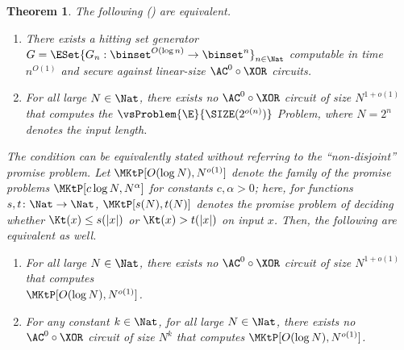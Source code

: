 \documentclass[11pt]{article}
\numberwithin{equation}{section}
\newtheorem{theorem}{Theorem}[section]
\theoremstyle{definition}
\theoremstyle{plain}
\begin{document}
\begin{theorem}
  \label{thm_AC0XOREquiv}
  The following () are equivalent.
  \begin{enumerate}
    \item
          \label{item_HSGagainstAC0XOR}
          There exists a hitting set generator $G = \ESet{ G_n : \binset^{O(\log n)} \to \binset^n }_{n \in \Nat} $ computable in time $n^{O(1)}$ and secure against linear-size $\AC^0 \circ \XOR$ circuits.
    \item
          \label{item_EvsSIZE}
          For all large $N \in \Nat$,
          there exists no $\AC^0 \circ \XOR$ circuit of size
          $N^{1 + o(1)}$
          that computes
          the $\vsProblem{\E}{\SIZE (2^{o(n)})}$ Problem, where $N = 2^n$ denotes the input length.
          \setcounter{TEMPenumi}{\value{enumi}}
  \end{enumerate}
  \begin{upshape}
    The condition can be equivalently stated without referring to the ``non-disjoint'' promise problem.
    Let $\MKtP[O(\log N), N^{o(1)}]$ denote the family of the promise problems
    $\MKtP[c \log N, N^\alpha]$ for constants $c, \alpha > 0$;
    here,
    for functions $s, t \colon \Nat \to \Nat$,
    $\MKtP[s(N), t(N)]$ denotes the promise problem of
    deciding whether $\Kt(x) \le s(|x|)$
    or $\Kt(x) > t(|x|)$ on input $x$.
    Then, the following are equivalent as well.
  \end{upshape}
  \begin{enumerate}
    \setcounter{enumi}{\value{TEMPenumi}}
    \item
          \label{item_EvsKt}
          For all large $N \in \Nat$,
          there exists no $\AC^0 \circ \XOR$ circuit of size
          $N^{1 + o(1)}$
          that computes\\  %
          $\MKtP[O(\log N), N^{o(1)}]$.
    \item
          \label{item_EvsKtLarge}
          For any constant $k \in \Nat$,
          for all large $N \in \Nat$,
          there exists no $\AC^0 \circ \XOR$ circuit of size
          $N^{k}$
          that computes
          $\MKtP[O(\log N), N^{o(1)}]$.
  \end{enumerate}
\end{theorem}

%
%
\end{document}
